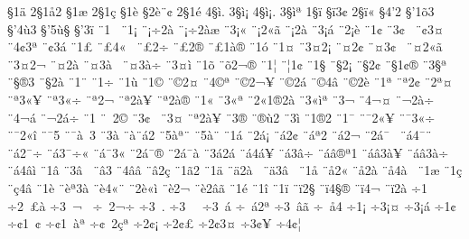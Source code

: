 {^^a71^^e4
2^^a71^^e52
^^a71^^e6
2^^a71^^e7
^^a71^^e8
^^a72^^e8^^a8^^a2
2^^a71^^e9
4^^a7^^ec.
3^^a7^^ec^^a1
4^^a7^^ec^^a1.
3^^a7^^ec^^aa
1^^a7^^ef
^^a7^^ef3^^a2
2^^a7^^ef^^ab
^^a74'2
^^a7'1^^f53
^^a7'4^^f93
^^a7'5^^f9^^a7
^^a7'3^^ef
^^a81^^a0
^^a81^^a1
^^a8^^a1^^f72^^e0^^ad
^^a8^^a1^^f72^^e0^^e6
^^a83^^a1^^ab
^^a8^^a12^^ab^^e3
^^a8^^a12^^e0
^^a83^^a1^^e1
^^a82^^a1^^e8
^^a81^^a2
^^a83^^a2^^a0
^^a8^^a23^^a4^^a0
^^a84^^a23^^aa
^^a8^^a23^^e1
^^a81^^a3
^^a8^^a34^^ab^^a0
^^a8^^a32^^ad^^f7
^^a8^^a32^^ad^^ae
^^a8^^a31^^e0^^ae
^^a81^^f3
^^a81^^a4
^^a83^^a42^^a1
^^a8^^a42^^a2
^^a8^^a43^^a2^^a0
^^a8^^a42^^ab^^e3
^^a83^^a42^^ac
^^a8^^a42^^e0
^^a8^^a43^^e0^^a0
^^a8^^a43^^e0^^f7
^^a83^^a4^^ec
^^a81^^f5
^^a8^^f52^^ac^^ad^^ae
^^a81^^a6
^^a8^^a61^^a2
^^a81^^a7
^^a8^^a72^^a1
^^a8^^a72^^a2
^^a8^^a71^^a2^^ae
^^a83^^a7^^aa
^^a8^^a7^^ae3
^^a8^^a72^^e0
^^a81^^a8
^^a81^^f7
^^a81^^f9
^^a81^^a9
^^a8^^a92^^a4
^^a84^^a9^^aa
^^a8^^a92^^ac^^a5
^^a8^^a92^^e1
^^a8^^a94^^e2
^^a8^^a92^^e8
^^a81^^aa
^^a8^^aa2^^a2
^^a82^^aa^^a4
^^a8^^aa3^^ab^^a5
^^a8^^aa3^^ab^^f7
^^a8^^aa2^^ac
^^a8^^aa2^^e0^^a5
^^a8^^aa2^^e0^^ae
^^a81^^ab
^^a83^^ab^^aa
^^a82^^ab1^^ae2^^e0
^^a83^^ab^^ec^^aa
^^a83^^ac
^^a84^^ac^^a4
^^a8^^ac2^^e0^^f7
^^a84^^ac^^e1
^^a8^^ac2^^e1^^f7
^^a81^^ad
^^a8^^ad^^a02^^a9
^^a83^^ad^^a2^^a0
^^a83^^ad^^a4
^^a8^^ad^^aa2^^e0^^a5
^^a83^^ad^^ae
^^a8^^ad^^ae^^f92
^^a83^^ad^^ec
^^a81^^ae2
^^a81^^af
^^a8^^af2^^ab^^a5
^^a8^^af3^^ab^^f7
^^a8^^af2^^ab^^ee
^^a8^^af5^^ad
^^a8^^af^^e0^^a03
^^a83^^e0
^^a8^^e0^^a8^^e12
^^a85^^e0^^aa^^a8
^^a85^^e0^^ad^^a8
^^a81^^e1
^^a82^^e1^^a1
^^a8^^e12^^a2
^^a8^^e1^^aa2
^^a8^^e12^^ac
^^a82^^e1^^af^^a0
^^a8^^e14^^af^^a8
^^a8^^e12^^af^^f7
^^a8^^e13^^af^^f7^^ab
^^a8^^e1^^af3^^ab
^^a82^^e1^^af^^ae
^^a82^^e1^^af^^e0
^^a83^^e12^^e1
^^a8^^e14^^e1^^a5
^^a8^^e13^^e2^^f7
^^a8^^e1^^e2^^ae^^aa1
^^a8^^e1^^e23^^e0^^a5
^^a8^^e1^^e23^^e0^^f7
^^a8^^e14^^e2^^ec
^^a81^^e2
^^a83^^e2^^a0
^^a8^^e23^^ad
^^a84^^e2^^e2
^^a8^^e22^^e7
^^a81^^e32
^^a81^^e4
^^a8^^e42^^e0^^a0
^^a8^^e43^^e2^^a0
^^a81^^e5
^^a8^^e52^^ab
^^a8^^e52^^e0
^^a8^^e54^^e0^^a0
^^a81^^e6
^^a81^^e7
^^a8^^e74^^e2
^^a81^^e8
^^a8^^e8^^aa3^^e0
^^a8^^e84^^ab^^a8
^^a82^^e8^^ab^^ec
^^a8^^e82^^ac
^^a8^^e82^^e2^^e3
^^a81^^e9
^^a81^^ee
^^a81^^ef
^^a8^^ef2^^a7
^^a8^^ef4^^a7^^ad^^ae
^^a8^^ef4^^ac
^^a8^^ef2^^e0
^^f71^^a0
^^f72^^a0^^a3^^e0
^^f73^^a0^^ac^^a0
^^f7^^a02^^ac^^f7
^^f73^^a0^^ad.
^^f73^^a0^^ad^^a0
^^f73^^a0^^e1
^^f7^^a0^^e12^^aa
^^f73^^a0^^e2^^e3
^^f7^^a0^^e54
^^f71^^a1
^^f73^^a1^^a4
^^f73^^a1^^e1
^^f71^^a2
^^f7^^a21^^a0^^a2
^^f7^^a21^^a0^^e0^^aa
^^f7^^a2^^a02^^e7^^aa
^^f72^^a2^^a1
^^f72^^a2^^a3
^^f72^^a23^^a4
^^f73^^a2^^a5
^^f74^^a2^^a6
}
